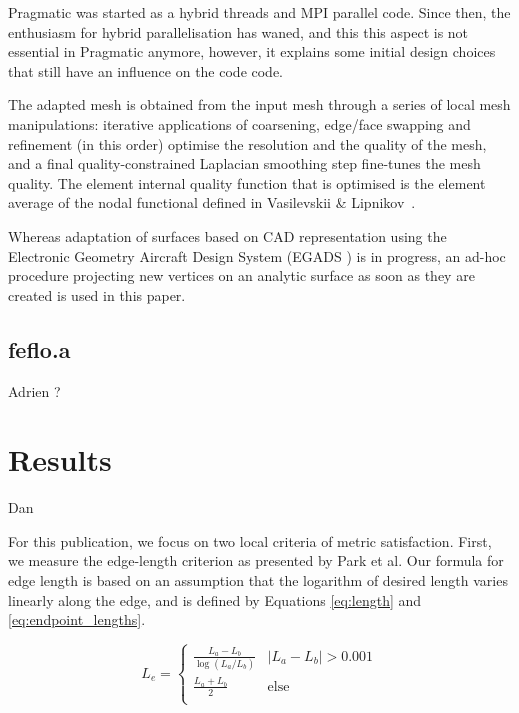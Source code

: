 \documentclass[3p,times,procedia,number]{elsarticle}
\begin{document}
Pragmatic was started as a hybrid threads and MPI parallel code. Since
then, the enthusiasm for hybrid parallelisation has waned, and this
this aspect is not essential in Pragmatic anymore, however, it
explains some initial design choices that still have an influence on
the code code.

The adapted mesh is obtained from the input mesh through a series of
local mesh manipulations: iterative applications of coarsening,
edge/face swapping and refinement (in this order) optimise the
resolution and the quality of the mesh, and a final
quality-constrained Laplacian smoothing step fine-tunes the mesh
quality.  The element internal quality function that is optimised is
the element average of the nodal functional defined in Vasilevskii \&
Lipnikov~\cite{Vasilevskii-1999}.

Whereas adaptation of surfaces based on CAD representation using the
Electronic Geometry Aircraft Design System (EGADS
\cite{haimes-drela-egads}) is in progress, an ad-hoc procedure
projecting new vertices on an analytic surface as soon as they are
created is used in this paper.

\subsection{feflo.a}
{\color{red} Adrien ?}


\section{Results}
{\color{red} Dan}

For this publication, we focus on two local criteria of metric
satisfaction.
First, we measure the edge-length criterion as presented
by Park et al.\cite{park-loseille-krakos-michal-adapt-decomposition}
Our formula for edge length is based on an assumption
that the logarithm of desired length varies linearly along the
edge,\cite{alauzet-fead-2010-size-gradation-aniso} and is defined
by Equations \ref{eq:length} and \ref{eq:endpoint_lengths}.

\begin{equation}
\label{eq:length}
L_e = \begin{cases}
\frac{L_a - L_b}{\log(L_a / L_b)} & |L_a - L_b| > 0.001 \\
\frac{L_a + L_b}{2} & \text{else} \\
\end{cases}
\end{equation}
\end{document}
